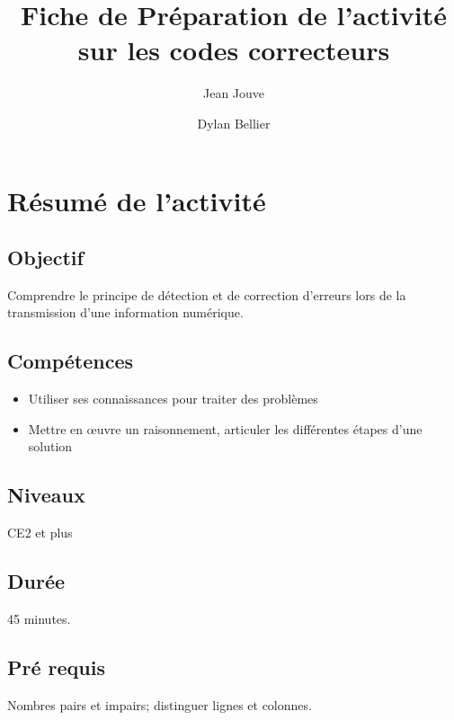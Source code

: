 \documentclass{article}
\title{Fiche de Préparation de l'activité sur les codes correcteurs}
\author{Jean Jouve \and Dylan Bellier}
\begin{document}
\maketitle

\newcommand{\columntitle}[1]{\textbf{#1}}

\section{Résumé de l'activité}

\subsection{Objectif}

Comprendre le principe de détection et de correction d'erreurs lors de la
transmission d'une information numérique.

\subsection{Compétences}

\begin{itemize}
    \item Utiliser ses connaissances pour traiter des problèmes
    \item Mettre en œuvre un raisonnement, articuler les différentes
      étapes d'une solution
\end{itemize}

\subsection{Niveaux}

CE2 et plus

\subsection{Durée}

45 minutes.

\subsection{Pré requis}

Nombres pairs et impairs; distinguer lignes et colonnes.

%
\end{document}
